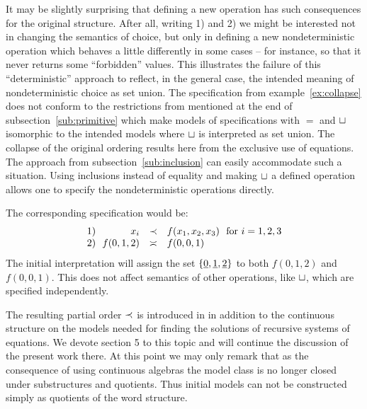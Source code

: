 { It may be slightly surprising that defining a new operation has such
consequences for the original structure. After all, writing 1) and 2)
we might be interested not in changing the semantics of choice, but
only in defining a new nondeterministic operation which behaves a
little differently in some cases -- for instance, so that it never
returns some ``forbidden'' values. This illustrates the failure of
this ``deterministic'' approach to reflect, in the general case, the
intended meaning of nondeterministic choice as set union. The
specification from example~\ref{ex:collapse} does not conform to the
restrictions from \cite{c:63} mentioned at the end of
subsection~\ref{sub:primitive} which make models of specifications
with $=$ and $\sqcup$ isomorphic to the intended models where $\sqcup$ is
interpreted as set union.  The collapse of the original ordering
results here from the exclusive use of equations. The approach from
subsection~\ref{sub:inclusion} can easily accommodate such a
situation.  Using inclusions instead of equality and making $\sqcup$ a
defined operation allows one to specify the nondeterministic
operations directly.

\begin{Example}\label{ex:incl} 
The corresponding specification would be:
\[ \begin{array}{r@{\ \ }rcl@{\ \ }l}
	1) & x_{i} & \Incl & f(x_{1},x_{2},x_{3}) & 	{\rm for\ } i=1,2,3\\
	2) & f(0,1,2) & \seteq & f(0,0,1) 	
\end{array}
\]
The initial interpretation will assign the set $\{\underline{0},\underline{1},\underline{2}\}$ to both 
$f(0,1,2)$ and $f(0,0,1)$. This does not 
affect semantics of other operations, like $\sqcup$, which are specified independently. 
\end{Example}
 
The resulting partial order $\mathrel{\prec}$ is introduced in \cite{c:77} in addition to the continuous structure on the models 
needed for finding the solutions of recursive systems of equations. We devote section 5 to this topic and 
will continue the discussion of the present work there. At this point we may only remark that as the 
consequence of using continuous algebras the model class is no longer closed under substructures and 
quotients. Thus initial models can not be constructed simply as quotients of the word structure.

}
